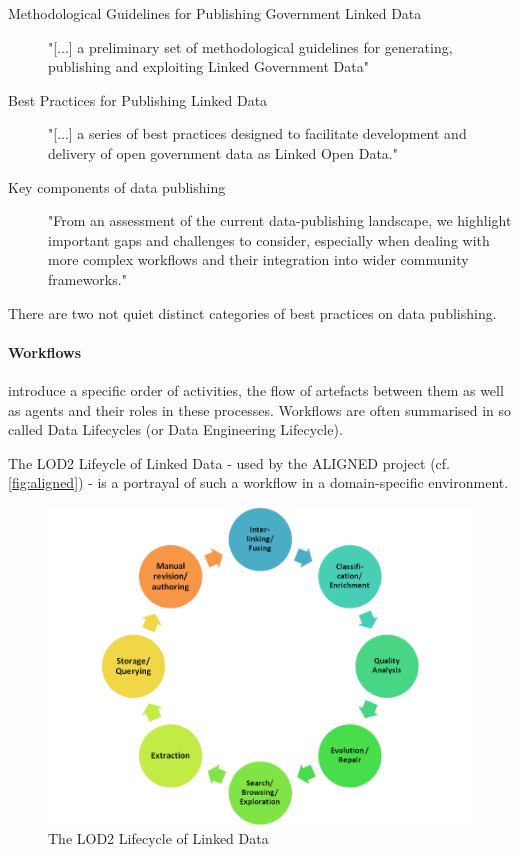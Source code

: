 \documentclass[a4paper,english,twoside,BCOR1.5cm,headsepline,DIV12,appendixprefix,final,12pt]{scrbook}
\begin{document}
\begin{description}
\item[Methodological Guidelines for Publishing
Government Linked Data] "[...] a preliminary set of methodological guidelines for generating, publishing and exploiting Linked Government Data" \cite{Terrazas}
\item[Best Practices for Publishing Linked Data] "[...] a series of best practices designed to facilitate development and delivery of open government data as Linked Open Data." \cite{Hyland:14:BPP}
\item[Key components of data publishing] "From an assessment of the current data-publishing landscape, we highlight important gaps and challenges to consider, especially when dealing with more complex workflows and their integration into wider community frameworks." \cite{austin_2015_34542}
\item[]
\end{description}

There are two not quiet distinct categories of best practices on data publishing. 

\paragraph{Workflows} introduce a specific order of activities, the flow of artefacts between them as well as agents and their roles in these processes. Workflows are often summarised in so called Data Lifecycles (or Data Engineering Lifecycle).

The LOD2 Lifeycle of Linked Data \cite{AuerBDEHILMMNSTW12} - used by the ALIGNED project (cf. \cref{fig:aligned}) - is a portrayal of such a workflow in a domain-specific environment.

\begin{figure}[!htbp]
\centering
  \includegraphics[width=12cm]{images/lod2lifecycle.png}
  \caption{The LOD2 Lifecycle of Linked Data \cite{AuerBDEHILMMNSTW12}}
  \label{fig:lod2lifecycle}
\end{figure}
\end{document}

